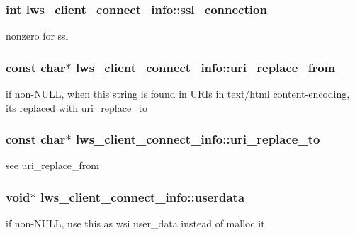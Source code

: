 \subsubsection[{\texorpdfstring{ssl\+\_\+connection}{ssl\_connection}}]{\setlength{\rightskip}{0pt plus 5cm}int lws\+\_\+client\+\_\+connect\+\_\+info\+::ssl\+\_\+connection}\hypertarget{structlws__client__connect__info_a9862297827639238a7a0b4054c3ddf3d}{}\label{structlws__client__connect__info_a9862297827639238a7a0b4054c3ddf3d}
nonzero for ssl 
\subsubsection[{\texorpdfstring{uri\+\_\+replace\+\_\+from}{uri\_replace\_from}}]{\setlength{\rightskip}{0pt plus 5cm}const char$\ast$ lws\+\_\+client\+\_\+connect\+\_\+info\+::uri\+\_\+replace\+\_\+from}\hypertarget{structlws__client__connect__info_a03c305fdca809667b6a9a83b3edfd83a}{}\label{structlws__client__connect__info_a03c305fdca809667b6a9a83b3edfd83a}
if non-\/\+N\+U\+LL, when this string is found in U\+R\+Is in text/html content-\/encoding, it\textquotesingle{}s replaced with uri\+\_\+replace\+\_\+to 
\subsubsection[{\texorpdfstring{uri\+\_\+replace\+\_\+to}{uri\_replace\_to}}]{\setlength{\rightskip}{0pt plus 5cm}const char$\ast$ lws\+\_\+client\+\_\+connect\+\_\+info\+::uri\+\_\+replace\+\_\+to}\hypertarget{structlws__client__connect__info_a9959ba103d3d2484e559a9f7879eebe3}{}\label{structlws__client__connect__info_a9959ba103d3d2484e559a9f7879eebe3}
see uri\+\_\+replace\+\_\+from 
\subsubsection[{\texorpdfstring{userdata}{userdata}}]{\setlength{\rightskip}{0pt plus 5cm}void$\ast$ lws\+\_\+client\+\_\+connect\+\_\+info\+::userdata}\hypertarget{structlws__client__connect__info_a9831b9f9ab54a1aec4bb15324f1c3836}{}\label{structlws__client__connect__info_a9831b9f9ab54a1aec4bb15324f1c3836}
if non-\/\+N\+U\+LL, use this as wsi user\+\_\+data instead of malloc it 
